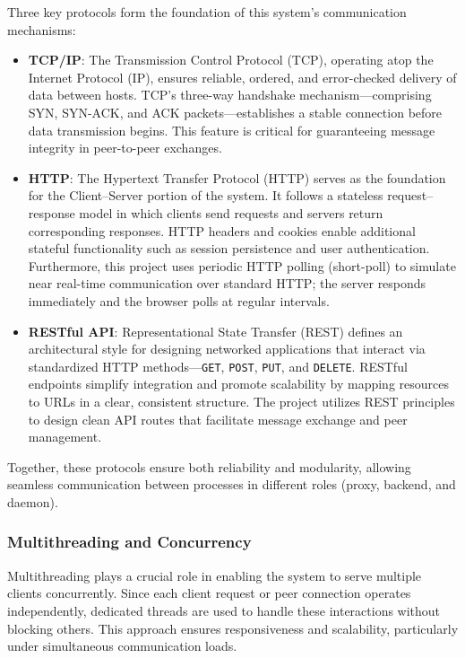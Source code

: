 Three key protocols form the foundation of this system’s communication mechanisms:
\begin{itemize}
    \item \textbf{TCP/IP}: The Transmission Control Protocol (TCP), operating atop the Internet Protocol (IP), ensures reliable, ordered, and error-checked delivery of data between hosts. TCP’s three-way handshake mechanism—comprising SYN, SYN-ACK, and ACK packets—establishes a stable connection before data transmission begins. This feature is critical for guaranteeing message integrity in peer-to-peer exchanges.

    \item \textbf{HTTP}: The Hypertext Transfer Protocol (HTTP) serves as the foundation for the Client–Server portion of the system. It follows a stateless request–response model in which clients send requests and servers return corresponding responses. HTTP headers and cookies enable additional stateful functionality such as session persistence and user authentication. Furthermore, this project uses periodic HTTP polling (short-poll) to simulate near real-time communication over standard HTTP; the server responds immediately and the browser polls at regular intervals.

    \item \textbf{RESTful API}: Representational State Transfer (REST) defines an architectural style for designing networked applications that interact via standardized HTTP methods—\texttt{GET}, \texttt{POST}, \texttt{PUT}, and \texttt{DELETE}. RESTful endpoints simplify integration and promote scalability by mapping resources to URLs in a clear, consistent structure. The project utilizes REST principles to design clean API routes that facilitate message exchange and peer management.
\end{itemize}

Together, these protocols ensure both reliability and modularity, allowing seamless communication between processes in different roles (proxy, backend, and daemon).

\subsubsection{Multithreading and Concurrency}
Multithreading plays a crucial role in enabling the system to serve multiple clients concurrently. Since each client request or peer connection operates independently, dedicated threads are used to handle these interactions without blocking others. This approach ensures responsiveness and scalability, particularly under simultaneous communication loads.

